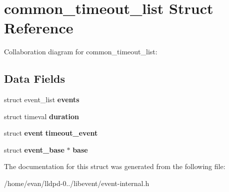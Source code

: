 \section{common\-\_\-timeout\-\_\-list \-Struct \-Reference}
\label{structcommon__timeout__list}


\-Collaboration diagram for common\-\_\-timeout\-\_\-list\-:
\subsection*{\-Data \-Fields}
\begin{DoxyCompactItemize}
\item 
struct event\-\_\-list {\bfseries events}\label{structcommon__timeout__list_a106e111bd7c72b4abb8f4c298bd5a772}

\item 
struct timeval {\bfseries duration}\label{structcommon__timeout__list_ad3d6c5b7e164c489fb90b2e622c5b252}

\item 
struct {\bf event} {\bfseries timeout\-\_\-event}\label{structcommon__timeout__list_aa2277fcb92b9a06b28d65f3d638ed474}

\item 
struct {\bf event\-\_\-base} $\ast$ {\bfseries base}\label{structcommon__timeout__list_ab1a154f7530a81e9dd1d63fc6b98a5c7}

\end{DoxyCompactItemize}


\-The documentation for this struct was generated from the following file\-:\begin{DoxyCompactItemize}
\item 
/home/evan/lldpd-\/0../libevent/event-\/internal.\-h\end{DoxyCompactItemize}
